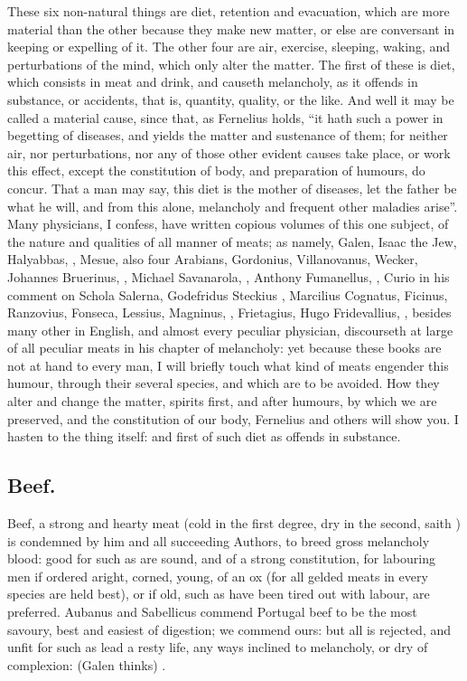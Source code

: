These six non-natural things are diet, retention and evacuation, which are more
material than the other because they make new matter, or else are conversant in
keeping or expelling of it. The other four are air, exercise, sleeping, waking,
and perturbations of the mind, which only alter the matter. The first of these
is diet, which consists in meat and drink, and causeth melancholy, as it
offends in substance, or accidents, that is, quantity, quality, or the like.
And well it may be called a material cause, since that, as
Fernelius holds, \enquote{it hath such a power in begetting of
diseases, and yields the matter and sustenance of them; for neither air, nor
perturbations, nor any of those other evident causes take place, or work this
effect, except the constitution of body, and preparation of humours, do concur.
That a man may say, this diet is the mother of diseases, let the father be what
he will, and from this alone, melancholy and frequent other maladies arise}.
Many physicians, I confess, have written copious volumes of this one subject,
of the nature and qualities of all manner of meats; as namely, Galen, Isaac the
Jew, Halyabbas, \Avicenna{}, Mesue, also four Arabians, Gordonius, Villanovanus,
Wecker, Johannes Bruerinus, , Michael
Savanarola, , Anthony Fumanellus,
, Curio in his comment on Schola
Salerna, Godefridus Steckius , Marcilius
Cognatus, Ficinus, Ranzovius, Fonseca, Lessius, Magninus,
, Frietagius, Hugo Fridevallius, \etc{},
besides many other in English, and almost every peculiar
physician, discourseth at large of all peculiar meats in his chapter of
melancholy: yet because these books are not at hand to every man, I will
briefly touch what kind of meats engender this humour, through their several
species, and which are to be avoided. How they alter and change the matter,
spirits first, and after humours, by which we are preserved, and the
constitution of our body, Fernelius and others will show you. I hasten to the
thing itself: and first of such diet as offends in substance.

\subsection{Beef.}
Beef, a strong and hearty meat (cold in the first degree, dry in the second,
saith ) is condemned by
him and all succeeding Authors, to breed gross melancholy blood: good for such
as are sound, and of a strong constitution, for labouring men if ordered
aright, corned, young, of an ox (for all gelded meats in every species are held
best), or if old, such as have been tired out with labour,
are preferred. Aubanus and Sabellicus commend Portugal beef to be the most
savoury, best and easiest of digestion; we commend ours: but all is rejected,
and unfit for such as lead a resty life, any ways inclined to melancholy, or
dry of complexion:  (Galen thinks) .

